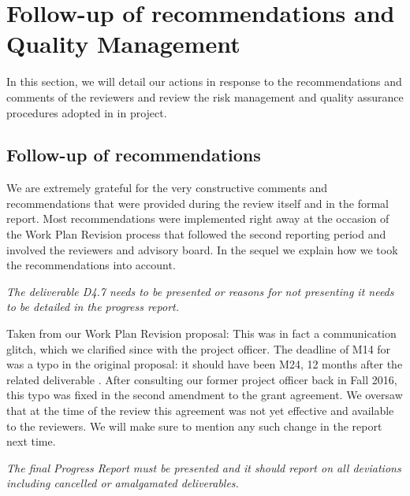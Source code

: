 \section{Follow-up of recommendations and Quality Management}

In this section, we will detail our actions in response to the recommendations and
comments of the reviewers and review the risk management and quality assurance procedures
adopted in in \pn project.

\subsection{Follow-up of recommendations}

We are extremely grateful for the very constructive comments and
recommendations that were provided during the review itself and in the
formal report. Most recommendations were implemented right away at the
occasion of the Work Plan Revision process that followed the second
reporting period and involved the reviewers and advisory board. In the
sequel we explain how we took the recommendations into account.

\newenvironment{recommendation}[1]
{\noindent{\textbf{#1:}} \begingroup\it}
{\endgroup}

\begin{recommendation}{Recommendation 1} The deliverable D4.7 needs to
  be presented or reasons for not presenting it needs to be detailed
  in the progress report.
\end{recommendation}

Taken from our Work Plan Revision proposal:
This was in fact a communication glitch, which we clarified since with
the project officer. The deadline of M14 for
 was a typo in the original proposal: it
should have been M24, 12 months after the related deliverable
. After consulting our former
project officer back in Fall 2016, this typo was fixed in the second
amendment to the grant agreement. We oversaw that at the time of the
review this agreement was not yet effective and available to the
reviewers. We will make sure to mention any such change in the report
next time.

\begin{recommendation}{Recommendation 2} The final Progress Report
  must be presented and it should report on all deviations including
  cancelled or amalgamated deliverables.
\end{recommendation}

